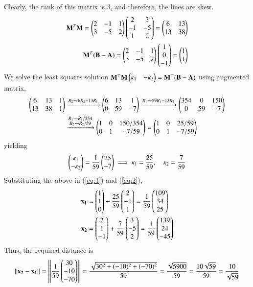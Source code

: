 \documentclass[journal]{IEEEtran}
\begin{document}
Clearly, the rank of this matrix is 3, and therefore, the lines are skew.
\begin{align}
    \mathbf{M}^T\mathbf{M} = \begin{pmatrix}2 & -1 & 1 \\ 3 & -5 & 2\end{pmatrix} \begin{pmatrix}2 & 3 \\ -1 & -5 \\ 1 & 2\end{pmatrix} = \begin{pmatrix}6 & 13 \\ 13 & 38\end{pmatrix} \\
    \mathbf{M}^T(\mathbf{B} - \mathbf{A}) = \begin{pmatrix}2 & -1 & 1 \\ 3 & -5 & 2\end{pmatrix} \begin{pmatrix}1 \\ 0 \\ -1\end{pmatrix} = \begin{pmatrix}1 \\ 1\end{pmatrix}
\end{align}
We solve the least squares solution $\mathbf{M}^\top\mathbf{M}\begin{pmatrix}\kappa_1 & -\kappa_2\end{pmatrix} = \mathbf{M}^\top(\mathbf{B} - \mathbf{A})$ using augmented matrix,
\begin{align*}
    \begin{pmatrix}6 & 13 & 1 \\ 13 & 38 & 1\end{pmatrix} 
    &\xrightarrow{R_2 \to 6R_2 - 13R_1} \begin{pmatrix}6 & 13 & 1 \\ 0 & 59 & -7\end{pmatrix} 
    \xrightarrow{R_1 \to 59R_1 - 13R_2} \begin{pmatrix}354 & 0 & 150 \\ 0 & 59 & -7\end{pmatrix} \\
    &\xrightarrow{\substack{R_1 \to R_1/354 \\ R_2 \to R_2/59}} \begin{pmatrix}1 & 0 & 150/354 \\ 0 & 1 & -7/59\end{pmatrix} 
    = \begin{pmatrix}1 & 0 & 25/59 \\ 0 & 1 & -7/59\end{pmatrix}
\end{align*}
yielding
\begin{align}
    \begin{pmatrix}\kappa_1 \\ -\kappa_2\end{pmatrix} = \frac{1}{59}\begin{pmatrix}25 \\ -7\end{pmatrix} \implies \kappa_1 = \frac{25}{59}, \quad \kappa_2 = \frac{7}{59} \label{eq:3}
\end{align}
Substituting the above in (\ref{eq:1}) and (\ref{eq:2}),
\begin{align}
    \mathbf{x_1} &= \begin{pmatrix}1 \\ 1 \\ 0\end{pmatrix} + \frac{25}{59}\begin{pmatrix}2 \\ -1 \\ 1\end{pmatrix} = \frac{1}{59}\begin{pmatrix}109 \\ 34 \\ 25\end{pmatrix} \\
    \mathbf{x_2} &= \begin{pmatrix}2 \\ 1 \\ -1\end{pmatrix} + \frac{7}{59}\begin{pmatrix}3 \\ -5 \\ 2\end{pmatrix} = \frac{1}{59}\begin{pmatrix}139 \\ 24 \\ -45\end{pmatrix}
\end{align}
Thus, the required distance is
\begin{align}
    ||\mathbf{x_2} - \mathbf{x_1}|| = \left|\left|\frac{1}{59}\begin{pmatrix}30 \\ -10 \\ -70\end{pmatrix}\right|\right| = \frac{\sqrt{30^2 + (-10)^2 + (-70)^2}}{59} = \frac{\sqrt{5900}}{59} = \frac{10\sqrt{59}}{59} = \frac{10}{\sqrt{59}}
\end{align}
\end{document}
